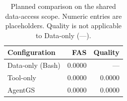 \begin{table}[t]
\caption{Planned comparison on the shared data-access scope. Numeric entries are placeholders. Quality is not applicable to Data-only (---).}
\label{tab:system-ablation}
\centering
\begin{tabularx}{\columnwidth}{@{}Xrr@{}}
\toprule
Configuration & FAS & Quality \\
\midrule
Data-only (Bash) & 0.0000 & --- \\
Tool-only & 0.0000 & 0.0000 \\
AgentGS & 0.0000 & 0.0000 \\
\bottomrule
\end{tabularx}
\end{table}
